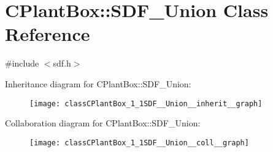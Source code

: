 \hypertarget{classCPlantBox_1_1SDF__Union}{}\section{C\+Plant\+Box\+:\+:S\+D\+F\+\_\+\+Union Class Reference}
\label{classCPlantBox_1_1SDF__Union}


{\ttfamily \#include $<$sdf.\+h$>$}



Inheritance diagram for C\+Plant\+Box\+:\+:S\+D\+F\+\_\+\+Union\+:\nopagebreak
\begin{figure}[H]
\begin{center}
\leavevmode
\texttt{[image: classCPlantBox\_1\_1SDF\_\_Union\_\_inherit\_\_graph]}
\end{center}
\end{figure}


Collaboration diagram for C\+Plant\+Box\+:\+:S\+D\+F\+\_\+\+Union\+:\nopagebreak
\begin{figure}[H]
\begin{center}
\leavevmode
\texttt{[image: classCPlantBox\_1\_1SDF\_\_Union\_\_coll\_\_graph]}
\end{center}
\end{figure}
